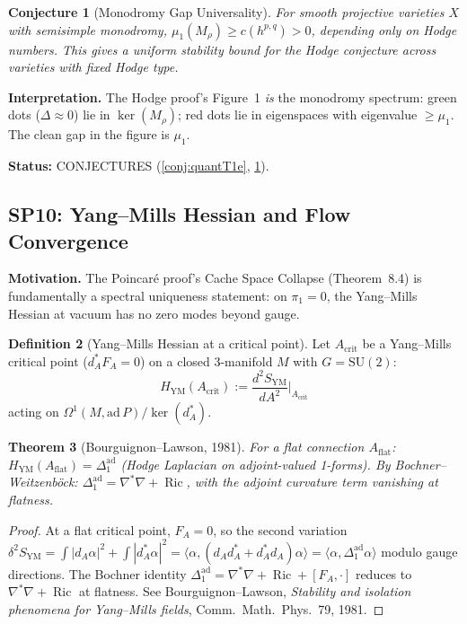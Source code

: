 \documentclass[11pt]{article}
\newtheorem{theorem}{Theorem}[section]
\newtheorem{conjecture}[theorem]{Conjecture}
\theoremstyle{definition}
\newtheorem{definition}[theorem]{Definition}
\theoremstyle{remark}
\newcommand{\Ric}{\operatorname{Ric}}
\newcommand{\HYM}{H_{\mathrm{YM}}}
\newcommand{\SYM}{S_{\mathrm{YM}}}
\begin{document}
\begin{conjecture}[Monodromy Gap Universality]\label{conj:monouniv}
For smooth projective varieties $X$ with semisimple monodromy, $\mu_1(M_\rho) \ge c(h^{p,q}) > 0$, depending only on Hodge numbers. This gives a uniform stability bound for the Hodge conjecture across varieties with fixed Hodge type.
\end{conjecture}

\textbf{Interpretation.} The Hodge proof's Figure~1 \emph{is} the monodromy spectrum: green dots ($\Delta \approx 0$) lie in $\ker(M_\rho)$; red dots lie in eigenspaces with eigenvalue $\ge \mu_1$. The clean gap in the figure is $\mu_1$.

\textbf{Status:} CONJECTURES (\ref{conj:quantT1e}, \ref{conj:monouniv}).


\subsection{SP10: Yang--Mills Hessian and Flow Convergence}

\textbf{Motivation.} The Poincar\'{e} proof's Cache Space Collapse (Theorem~8.4) is fundamentally a spectral uniqueness statement: on $\pi_1 = 0$, the Yang--Mills Hessian at vacuum has no zero modes beyond gauge.

\begin{definition}[Yang--Mills Hessian at a critical point]
Let $A_{\mathrm{crit}}$ be a Yang--Mills critical point ($d_A^* F_A = 0$) on a closed 3-manifold $M$ with $G = \mathrm{SU}(2)$:
\[
\HYM(A_{\mathrm{crit}}) := \frac{d^2 \SYM}{dA^2}\bigg|_{A_{\mathrm{crit}}}
\]
acting on $\Omega^1(M, \mathrm{ad}\,P)/\ker(d_A^*)$.
\end{definition}

\begin{theorem}[Bourguignon--Lawson, 1981]\label{thm:BL}
For a flat connection $A_{\mathrm{flat}}$: $\HYM(A_{\mathrm{flat}}) = \Delta_1^{\mathrm{ad}}$ (Hodge Laplacian on adjoint-valued 1-forms). By Bochner--Weitzenb\"{o}ck: $\Delta_1^{\mathrm{ad}} = \nabla^*\nabla + \Ric$, with the adjoint curvature term vanishing at flatness.
\end{theorem}

\begin{proof}
At a flat critical point, $F_A = 0$, so the second variation $\delta^2\SYM = \int|d_A\alpha|^2 + \int|d_A^*\alpha|^2 = \langle\alpha, (d_Ad_A^* + d_A^*d_A)\alpha\rangle = \langle\alpha, \Delta_1^{\mathrm{ad}}\alpha\rangle$ modulo gauge directions. The Bochner identity $\Delta_1^{\mathrm{ad}} = \nabla^*\nabla + \Ric + [F_A, \cdot]$ reduces to $\nabla^*\nabla + \Ric$ at flatness. See Bourguignon--Lawson, \emph{Stability and isolation phenomena for Yang--Mills fields}, Comm.\ Math.\ Phys.\ 79, 1981.
\end{proof}
\end{document}
